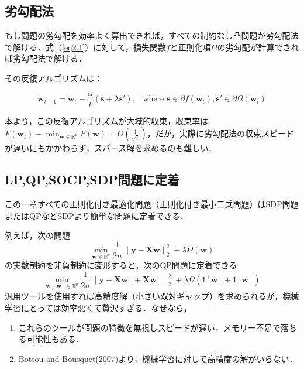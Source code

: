 \documentclass[a4paper,11pt]{jsarticle}
\numberwithin{theorem}{section}  %
\numberwithin{equation}{section} %
\begin{document}
\subsection{劣勾配法}
もし問題の劣勾配を効率よく算出できれば，すべての制約なし凸問題が劣勾配法で解ける．式（\ref{eq2.1}）に対して，損失関数$f$と正則化項$\Omega$の劣勾配が計算できれば劣勾配法で解ける．

その反復アルゴリズムは：

\begin{equation}
\bm{w}_{t+1} = \bm{w}_t - \frac{\alpha}{t}(\bm{s} + \lambda\bm{s}'), \,\,\, \text{ where } \bm{s} \in \partial f(\bm{w}_t), \bm{s}' \in \partial \Omega (\bm{w}_t) 
\end{equation}

本\cite{iloco}より，この反復アルゴリズムが大域的収束，収束率は$F(\bm{w}_t) - \min_{\bm{w}\in \mathbb{R}^p} F(\bm{w}) = O(\frac{1}{\sqrt{t}})$，だが，実際に劣勾配法の収束スピードが遅いにもかかわらず，スパース解を求めるのも難しい．

\subsection{LP,QP,SOCP,SDP問題に定着}
この一章すべての正則化付き最適化問題（正則化付き最小二乗問題）はSDP問題またはQPなどSDPより簡単な問題に定着できる．

例えば，次の問題
\begin{equation}
\min_{\bm{w} \in \mathbb{R}^p} \frac{1}{2n}\| \bm{y} - \bm{X}\bm{w} \|_2^2 + \lambda \Omega(\bm{w})
\end{equation}
の実数制約を非負制約に変形すると，次のQP問題に定着できる
\begin{equation}
\min_{\bm{w}_+,\bm{w}_- \in \mathbb{R}^p} \frac{1}{2n}\| \bm{y} - \bm{X}\bm{w}_+ + \bm{X}\bm{w}_-  \|_2^2 + \lambda \Omega(1^\intercal \bm{w}_+ + 1^\intercal \bm{w}_-)
\end{equation}
汎用ツールを使用すれば高精度解（小さい双対ギャップ）を求められるが，機械学習にとっては効率悪くて贅沢すぎる．なぜなら，
\begin{enumerate}
\item これらのツールが問題の特徴を無視しスピードが遅い，メモリー不足で落ちる可能性もある．
\item Bottou and Bousquet(2007)より，機械学習に対して高精度の解がいらない． 
\end{enumerate}
\end{document}
